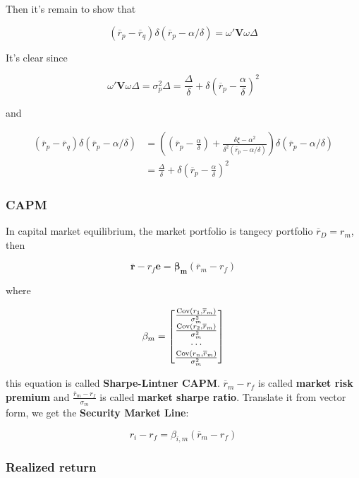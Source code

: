 \documentclass{article}
\begin{document}
Then it's remain to show that

\[ (\overline{r}_p-\overline{r}_q)\delta(\overline{r}_p-\alpha/\delta)=\omega'\mathbf{V}\omega\Delta \]

It's clear since

\[ \omega'\mathbf{V}\omega \Delta=\sigma_p^2\Delta=\frac{\Delta}{\delta}+\delta(\overline{r}_p-\frac{\alpha}{\delta})^2 \]

and

\[ \begin{aligned}
  (\overline{r}_p-\overline{r}_q)\delta(\overline{r}_p-\alpha/\delta)&=
  ((\overline{r}_p-\frac{\alpha}{\delta})+\frac{\delta\xi-\alpha^2}{\delta^2(\overline{r}_p-\alpha/\delta)})\delta(\overline{r}_p-\alpha/\delta)
  \\&=\frac{\Delta}{\delta}+\delta(\overline{r}_p-\frac{\alpha}{\delta})^2
\end{aligned} \]

\hypertarget{capm-1}{%
\subsubsection{CAPM}\label{capm-1}}

In capital market equilibrium, the market portfolio is tangecy portfolio
\(\overline{r}_D={r}_m\), then

\[ \bm{\mathbf{\overline{r}-\mathit{r_f}e}}=\bm{\mathbf{\beta_m}}(\overline{r}_m-r_f) \]

where

\[ \beta_m=\begin{bmatrix}
  \frac{\operatorname{Cov}(r_1,\overline{r}_m)}{\sigma^2_m}\\
  \frac{\operatorname{Cov}(r_2,\overline{r}_m)}{\sigma^2_m}\\
  \cdots\\
  \frac{\operatorname{Cov}(r_n,\overline{r}_m)}{\sigma^2_m}\\
\end{bmatrix} \]

this equation is called \textbf{Sharpe-Lintner CAPM}.
\(\overline{r}_m-r_f\) is called \textbf{market risk premium} and
\(\frac{\overline{r}_m-r_f}{\sigma_m}\) is called \textbf{market sharpe
ratio}. Translate it from vector form, we get the \textbf{Security
Market Line}:

\[ 
r_i-r_f=\beta_{i,m}(\overline{r}_m-r_f) 
\]

\hypertarget{realized-return}{%
\subsubsection{Realized return}\label{realized-return}}
\end{document}
